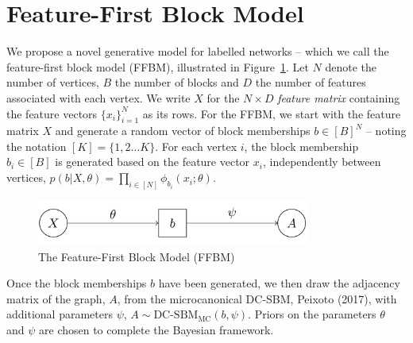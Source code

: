 \section{Feature-First Block Model}

We propose a novel generative model for labelled networks -- which we call the feature-first block model (FFBM),
illustrated in Figure~\ref{fig:ffbm}.
Let $N$ denote the number of vertices, $B$ the number of blocks
and $D$ the number of features associated with each vertex.
We write $X$ for the $N\times D$ {\em feature matrix} containing
the feature vectors $\{x_i\}_{i=1}^{N}$ 
as its rows.
%
For the FFBM, we start with the feature matrix $X$ and generate a random
vector of block memberships $b \in [B]^N$ -- noting the notation $[K] = \{1, 2 \dots K\}$. For each vertex $i$, the
block membership $b_i\in[B]$ is generated based on the feature
vector $x_i$, independently between vertices, 
$p(b| X, \theta) = \prod_{i \in [N]} \phi_{b_i} (x_i; \theta)$.
%
\begin{figure}[!ht]
	\centering
%		
	\includegraphics[width=0.8\textwidth]{img/ffbm.png}
	\caption{The Feature-First Block Model (FFBM)}
	\label{fig:ffbm}
\end{figure}

Once the block memberships $b$ have been generated, we then draw the 
adjacency matrix of the graph, $A$, from the microcanonical DC-SBM, Peixoto (2017), with additional parameters 
$\psi$,
$
	A \sim \textrm{DC-SBM}_{\textrm{MC}} (b, \psi).
	\label{eqn:A-generation}
$
Priors on the parameters $\theta$ and $\psi$ are chosen to complete the Bayesian framework.
